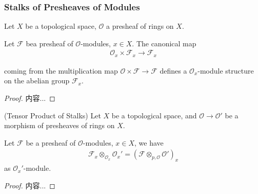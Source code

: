 \documentclass[Total.tex]{subfiles}
\begin{document}
				\subsubsection{Stalks of Presheaves of Modules}
					\begin{lemma}
						Let $X$ be a topological space, $\mathcal{O}$ a presheaf of rings on $X$.
						
						Let $\mathcal{F}$ bea presheaf of $\mathcal{O}$-modules, $x\in X$. The canonical map
						\begin{gather*}
							\mathcal{O}_x\times \mathcal{F}_x\rightarrow \mathcal{F}_x
						\end{gather*}
						
						coming from the multiplication map $\mathcal{O}\times \mathcal{F}\rightarrow \mathcal{F}$ defines a $\mathcal{O}_x$-module structure on the abelian group $\mathcal{F}_x$.
					\end{lemma}
					\begin{proof}
						内容...
					\end{proof}
					
					\begin{lemma}
						(Tensor Product of Stalks) Let $X$ be a topological space, and $\mathcal{O}\rightarrow \mathcal{O}'$ be a morphism of presheaves of rings on $X$. 
						
						Let $\mathcal{F}$ be a presheaf of $\mathcal{O}$-modules, $x\in X$, we have
						\begin{gather*}
							\mathcal{F}_x\otimes_{\mathcal{O}_x} \mathcal{O}_x'=(\mathcal{F}\otimes_{p,\mathcal{O}} \mathcal{O}')_x
						\end{gather*}
						as $\mathcal{O}_x'$-module.
					\end{lemma}
					\begin{proof}
						内容...
					\end{proof}
\end{document}
